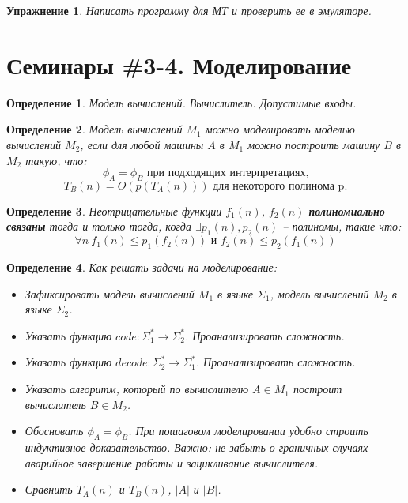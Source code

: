 \documentclass[a4paper, 12pt]{extarticle}
\newtheorem*{definition}{Определение}
\newtheorem*{homework}{Упражнение}
\begin{document}
\begin{homework}
Написать программу для МТ и проверить ее в эмуляторе.
\end{homework}

\newpage
\section*{Семинары \#3-4. Моделирование}
\begin{definition}
 Модель вычислений. Вычислитель. Допустимые входы.
\end{definition}

\begin{definition}
 Модель вычислений $M_1$ можно моделировать моделью вычислений $M_2$, если для любой машины $A$ в $M_1$ можно построить машину 
 $B$ в $M_2$ такую, что: 
 $$\phi_A = \phi_B \text{ при подходящих интерпретациях,}$$
 $$T_B(n) = O(p(T_A(n))) \text{ для некоторого полинома p.} $$
\end{definition}

\begin{definition}
 Неотрицательные функции $f_1(n)$, $f_2(n)$ \textbf{полиномиально связаны} тогда и только тогда, когда 
 $\exists p_1(n), p_2(n)$ -- полиномы, такие что:
 $$\forall n\ f_1(n) \leq p_1(f_2(n)) \text{ и } f_2(n) \leq p_2(f_1(n))$$
\end{definition}

\begin{definition}
 Как решать задачи на моделирование:
 \begin{itemize}
  \item Зафиксировать модель вычислений $M_1$ в языке $\Sigma_1$,
  модель вычислений $M_2$ в языке $\Sigma_2$.
  \item Указать функцию $code: \Sigma_{1}^{*} \rightarrow \Sigma_{2}^{*}$. Проанализировать сложность.
  \item Указать функцию $decode: \Sigma_{2}^{*} \rightarrow \Sigma_{1}^{*}$. Проанализировать сложность.
  \item Указать алгоритм, который по вычислителю $A \in M_1$ построит вычислитель $B \in M_2$.
  \item Обосновать $\phi_A = \phi_B$. При пошаговом моделировании удобно строить индуктивное доказательство. 
        Важно: не забыть о граничных случаях -- аварийное завершение работы и зацикливание вычислителя.
  \item Сравнить $T_A(n)$ и $T_B(n)$, $|A|$ и $|B|$.
 \end{itemize}
\end{definition}
\end{document}
